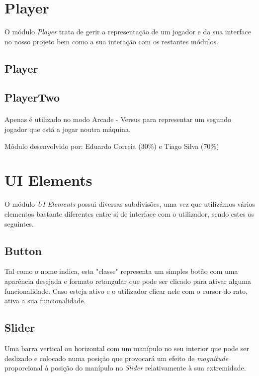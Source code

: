 \documentclass{report}
\begin{document}
\section{Player}

O módulo \textit{Player} trata de gerir a representação de um jogador e da sua interface no nosso projeto bem como a sua interação com os restantes módulos. 

\subsection{Player}

\subsection{PlayerTwo}

\paragraph{}
Apenas é utilizado no modo Arcade - Versus para representar um segundo jogador que está a jogar noutra máquina. 

Módulo desenvolvido por: Eduardo Correia (30\%) e Tiago Silva (70\%) 

\section{UI Elements}

O módulo \textit{UI Elements} possui diversas subdivisões, uma vez que utilizámos vários elementos bastante diferentes entre si de interface com o utilizador, sendo estes os seguintes.\footnotemark

\subsection{Button}

Tal como o nome indica, esta "classe" representa um simples botão com uma aparência desejada e formato retangular que pode ser clicado para ativar alguma funcionalidade.
Caso esteja ativo e o utilizador clicar nele com o cursor do rato, ativa a sua funcionalidade.

\subsection{Slider}

Uma barra vertical ou horizontal com um manípulo no seu interior que pode ser deslizado e colocado numa posição que provocará um efeito de \textit{magnitude} proporcional à posição do manípulo no \textit{Slider} relativamente à sua extremidade.
\end{document}
